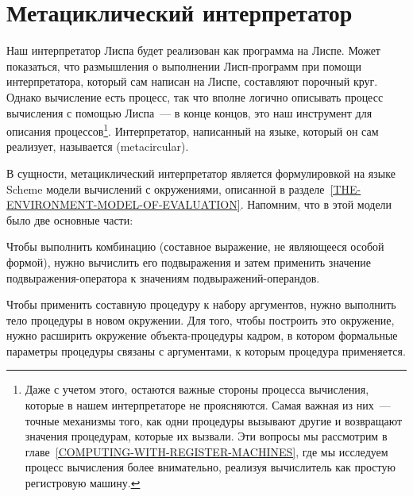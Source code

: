 \section{Метациклический интерпретатор}
\label{THE-METACIRCULAR-EVALUATOR}%


Наш интерпретатор 
Лиспа будет реализован как программа на
Лиспе.  Может показаться, что размышления о выполнении Лисп-программ
при помощи интерпретатора, который сам написан на Лиспе, составляют
порочный круг.  Однако вычисление есть процесс, так что вполне
логично описывать процесс вычисления с помощью Лиспа~--- в конце
концов, это наш инструмент для описания процессов\footnote{Даже с учетом 
этого, остаются важные стороны процесса
вычисления, которые в нашем интерпретаторе не проясняются.  Самая
важная из них~--- точные механизмы того, как одни процедуры вызывают
другие и возвращают значения процедурам, которые их вызвали.  Эти
вопросы мы рассмотрим  в 
главе~\ref{COMPUTING-WITH-REGISTER-MACHINES}, где мы
исследуем процесс вычисления более внимательно, реализуя
вычислитель как простую регистровую машину.}.
Интерпретатор, написанный на языке, который он сам реализует,
называется 
 (metacircular).

 В сущности,
метациклический интерпретатор является 
формулировкой на языке Scheme модели вычислений
с окружениями, описанной в 
разделе~\ref{THE-ENVIRONMENT-MODEL-OF-EVALUATION}. Напомним, что в этой
модели было две основные части: 

\begin{plainlist}
\item
Чтобы выполнить комбинацию (составное выражение, не
являющееся особой формой), нужно вычислить его подвыражения и затем
применить значение подвыражения-оператора к значениям
подвыражений-операндов.

\item
Чтобы применить составную процедуру к набору
аргументов, нужно выполнить тело процедуры в новом окружении.  Для
того, чтобы построить это окружение, нужно расширить окружение
объекта-процедуры кадром, в котором формальные параметры процедуры
связаны с аргументами, к которым процедура применяется.
\end{plainlist}

